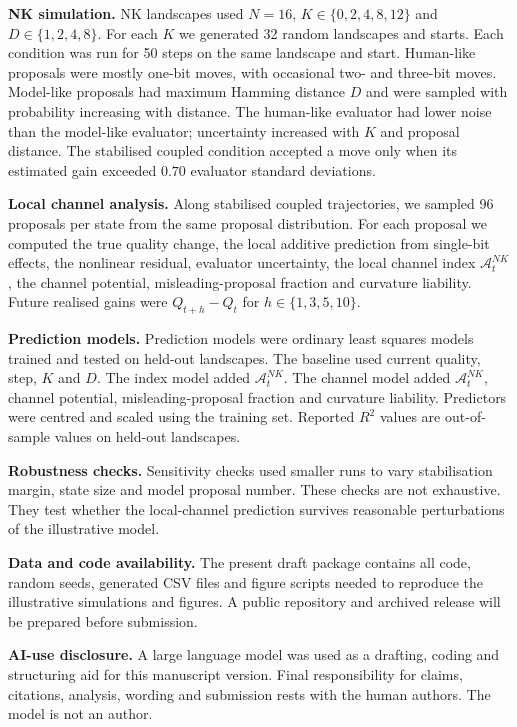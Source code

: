 \documentclass[11pt]{article}
\newcommand{\ANK}{\mathcal{A}^{NK}}
\begin{document}
\textbf{NK simulation.} NK landscapes used $N=16$, $K\in\{0,2,4,8,12\}$ and $D\in\{1,2,4,8\}$. For each $K$ we generated 32 random landscapes and starts. Each condition was run for 50 steps on the same landscape and start. Human-like proposals were mostly one-bit moves, with occasional two- and three-bit moves. Model-like proposals had maximum Hamming distance $D$ and were sampled with probability increasing with distance. The human-like evaluator had lower noise than the model-like evaluator; uncertainty increased with $K$ and proposal distance. The stabilised coupled condition accepted a move only when its estimated gain exceeded $0.70$ evaluator standard deviations.

\textbf{Local channel analysis.} Along stabilised coupled trajectories, we sampled 96 proposals per state from the same proposal distribution. For each proposal we computed the true quality change, the local additive prediction from single-bit effects, the nonlinear residual, evaluator uncertainty, the local channel index $\ANK_t$, the channel potential, misleading-proposal fraction and curvature liability. Future realised gains were $Q_{t+h}-Q_t$ for $h\in\{1,3,5,10\}$.

\textbf{Prediction models.} Prediction models were ordinary least squares models trained and tested on held-out landscapes. The baseline used current quality, step, $K$ and $D$. The index model added $\ANK_t$. The channel model added $\ANK_t$, channel potential, misleading-proposal fraction and curvature liability. Predictors were centred and scaled using the training set. Reported $R^2$ values are out-of-sample values on held-out landscapes.

\textbf{Robustness checks.} Sensitivity checks used smaller runs to vary stabilisation margin, state size and model proposal number. These checks are not exhaustive. They test whether the local-channel prediction survives reasonable perturbations of the illustrative model.

\textbf{Data and code availability.} The present draft package contains all code, random seeds, generated CSV files and figure scripts needed to reproduce the illustrative simulations and figures. A public repository and archived release will be prepared before submission.

\textbf{AI-use disclosure.} A large language model was used as a drafting, coding and structuring aid for this manuscript version. Final responsibility for claims, citations, analysis, wording and submission rests with the human authors. The model is not an author.
\end{document}
